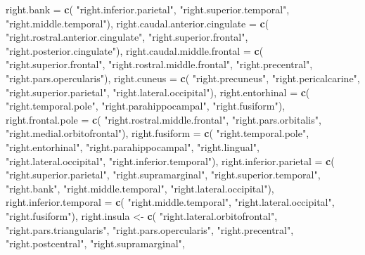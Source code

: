 \documentclass[
]{article}
\newenvironment{Shaded}{\begin{snugshade}}{\end{snugshade}}
\newcommand{\DataTypeTok}[1]{\textcolor[rgb]{0.13,0.29,0.53}{#1}}
\newcommand{\KeywordTok}[1]{\textcolor[rgb]{0.13,0.29,0.53}{\textbf{#1}}}
\newcommand{\NormalTok}[1]{#1}
\newcommand{\StringTok}[1]{\textcolor[rgb]{0.31,0.60,0.02}{#1}}
\begin{document}
\begin{Shaded}
\begin{Highlighting}[]
 \DataTypeTok{right.bank =} \KeywordTok{c}\NormalTok{(}
   \StringTok{"right.inferior.parietal"}\NormalTok{,  }\StringTok{"right.superior.temporal"}\NormalTok{, }\StringTok{"right.middle.temporal"}\NormalTok{),}
 \DataTypeTok{right.caudal.anterior.cingulate =} \KeywordTok{c}\NormalTok{(}
   \StringTok{"right.rostral.anterior.cingulate"}\NormalTok{, }\StringTok{"right.superior.frontal"}\NormalTok{,}
   \StringTok{"right.posterior.cingulate"}\NormalTok{),}
 \DataTypeTok{right.caudal.middle.frontal =} \KeywordTok{c}\NormalTok{(}
   \StringTok{"right.superior.frontal"}\NormalTok{, }\StringTok{"right.rostral.middle.frontal"}\NormalTok{, }\StringTok{"right.precentral"}\NormalTok{,}
   \StringTok{"right.pars.opercularis"}\NormalTok{),}
 \DataTypeTok{right.cuneus =} \KeywordTok{c}\NormalTok{(}
   \StringTok{"right.precuneus"}\NormalTok{, }\StringTok{"right.pericalcarine"}\NormalTok{, }\StringTok{"right.superior.parietal"}\NormalTok{,}
   \StringTok{"right.lateral.occipital"}\NormalTok{),}
 \DataTypeTok{right.entorhinal =} \KeywordTok{c}\NormalTok{(}
   \StringTok{"right.temporal.pole"}\NormalTok{, }\StringTok{"right.parahippocampal"}\NormalTok{, }\StringTok{"right.fusiform"}\NormalTok{),}
 \DataTypeTok{right.frontal.pole =} \KeywordTok{c}\NormalTok{(}
   \StringTok{"right.rostral.middle.frontal"}\NormalTok{, }\StringTok{"right.pars.orbitalis"}\NormalTok{, }
   \StringTok{"right.medial.orbitofrontal"}\NormalTok{),}
 \DataTypeTok{right.fusiform =} \KeywordTok{c}\NormalTok{(}
   \StringTok{"right.temporal.pole"}\NormalTok{, }\StringTok{"right.entorhinal"}\NormalTok{, }\StringTok{"right.parahippocampal"}\NormalTok{,}
   \StringTok{"right.lingual"}\NormalTok{, }\StringTok{"right.lateral.occipital"}\NormalTok{, }\StringTok{"right.inferior.temporal"}\NormalTok{),}
 \DataTypeTok{right.inferior.parietal =} \KeywordTok{c}\NormalTok{(}
   \StringTok{"right.superior.parietal"}\NormalTok{, }\StringTok{"right.supramarginal"}\NormalTok{, }\StringTok{"right.superior.temporal"}\NormalTok{,}
   \StringTok{"right.bank"}\NormalTok{, }\StringTok{"right.middle.temporal"}\NormalTok{, }\StringTok{"right.lateral.occipital"}\NormalTok{),}
 \DataTypeTok{right.inferior.temporal =} \KeywordTok{c}\NormalTok{(}
   \StringTok{"right.middle.temporal"}\NormalTok{, }\StringTok{"right.lateral.occipital"}\NormalTok{, }\StringTok{"right.fusiform"}\NormalTok{),}
\NormalTok{ right.insula <-}\StringTok{ }\KeywordTok{c}\NormalTok{(}
   \StringTok{"right.lateral.orbitofrontal"}\NormalTok{, }\StringTok{"right.pars.triangularis"}\NormalTok{, }\StringTok{"right.pars.opercularis"}\NormalTok{,}
   \StringTok{"right.precentral"}\NormalTok{, }\StringTok{"right.postcentral"}\NormalTok{, }\StringTok{"right.supramarginal"}\NormalTok{,}

\end{Highlighting}
\end{Shaded}
\end{document}

